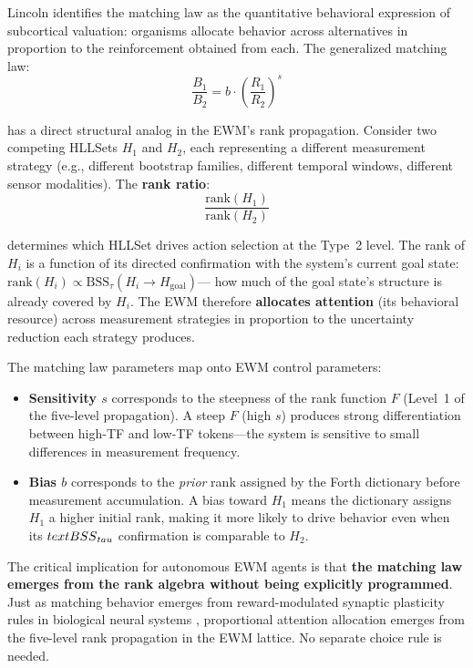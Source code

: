 \documentclass[11pt,a4paper]{article}
\theoremstyle{remark}
\begin{document}
Lincoln identifies the matching law as the quantitative behavioral expression of
subcortical valuation: organisms allocate behavior across alternatives in
proportion to the reinforcement obtained from each. The generalized matching law:
\begin{equation}
  \frac{B_1}{B_2} = b \cdot \left(\frac{R_1}{R_2}\right)^s
\end{equation}

has a direct structural analog in the EWM's rank propagation. Consider two
competing HLLSets $H_1$ and $H_2$, each representing a different measurement
strategy (e.g., different bootstrap families, different temporal windows,
different sensor modalities). The \textbf{rank ratio}:
\begin{equation}
  \frac{\text{rank}(H_1)}{\text{rank}(H_2)}
\end{equation}

determines which HLLSet drives action selection at the Type~2 level. The rank of
$H_i$ is a function of its directed confirmation with the system's current goal
state: $\text{rank}(H_i) \propto \text{BSS}_{\tau}(H_i \to H_{\text{goal}})$---
how much of the goal state's structure is already covered by $H_i$. The EWM
therefore \textbf{allocates attention} (its behavioral resource) across
measurement strategies in proportion to the uncertainty reduction each strategy
produces.

The matching law parameters map onto EWM control parameters:
\begin{itemize}[leftmargin=*,nosep]
  \item \textbf{Sensitivity $s$} corresponds to the steepness of the rank
    function $F$ (Level~1 of the five-level propagation). A steep $F$ (high $s$)
    produces strong differentiation between high-TF and low-TF tokens---the
    system is sensitive to small differences in measurement frequency.
  \item \textbf{Bias $b$} corresponds to the \textit{prior} rank assigned by
    the Forth dictionary before measurement accumulation. A bias toward $H_1$
    means the dictionary assigns $H_1$ a higher initial rank, making it more
    likely to drive behavior even when its $\\text{BSS}_{\\tau}$ confirmation is comparable to
    $H_2$.
\end{itemize}

The critical implication for autonomous EWM agents is that \textbf{the matching
law emerges from the rank algebra without being explicitly programmed}. Just as
matching behavior emerges from reward-modulated synaptic plasticity rules in
biological neural systems \cite{lincoln2026}, proportional attention allocation
emerges from the five-level rank propagation in the EWM lattice. No separate
choice rule is needed.
\end{document}
